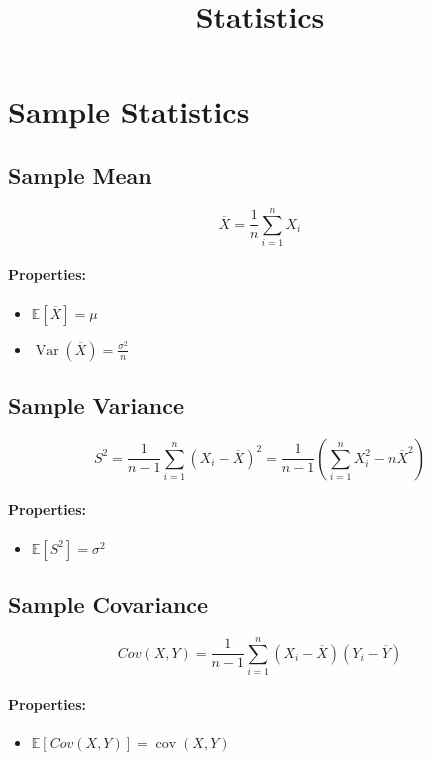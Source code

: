 \documentclass{article}
\title{Statistics}
\date{}
\begin{document}
\maketitle

\tableofcontents

\newpage
\section{Sample Statistics}

\subsection{Sample Mean}
\[
    \overline{X} = \frac{1}{n}\sum_{i=1}^{n} X_i
\]
\paragraph{Properties:}
\begin{itemize}
    \item $\mathbb{E}[\overline{X}] = \mu$
    \item $\displaystyle \operatorname{Var}(\overline{X}) = \frac{\sigma^2}{n}$
\end{itemize}

\subsection{Sample Variance}
\[
    S^2 = \frac{1}{n-1}\sum_{i=1}^{n}(X_i - \overline{X})^2 = \frac{1}{n-1}\left(\sum_{i=1}^{n} X_i^2 - n\overline{X}^2\right)
\]
\paragraph{Properties:}
\begin{itemize}
    \item $\mathbb{E}[S^2] = \sigma^2$
\end{itemize}

\subsection{Sample Covariance}
\[
    Cov(X,Y) = \frac{1}{n-1}\sum_{i=1}^{n}(X_i - \overline{X})(Y_i - \overline{Y})
\]
\paragraph{Properties:}
\begin{itemize}
    \item $\mathbb{E}[Cov(X,Y)] = \operatorname{cov}(X,Y)$
\end{itemize}
\end{document}
